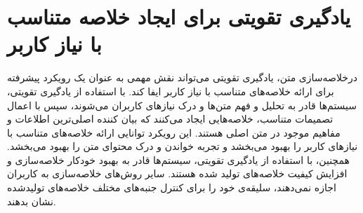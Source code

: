 \section{ یادگیری تقویتی برای ایجاد خلاصه متناسب با نیاز کاربر}
درخلاصه‌سازی متن، یادگیری تقویتی می‌تواند نقش مهمی به عنوان یک رویکرد پیشرفته برای ارائه خلاصه‌های متناسب با نیاز کاربر ایفا کند. با استفاده از یادگیری تقویتی، سیستم‌ها قادر به تحلیل و فهم متن‌ها و درک نیازهای کاربران می‌شوند، سپس با اعمال تصمیمات متناسب، خلاصه‌هایی ایجاد می‌کنند که بیان کننده اصلی‌ترین اطلاعات و مفاهیم موجود در متن اصلی هستند. این رویکرد توانایی ارائه خلاصه‌های متناسب با نیازهای کاربر را بهبود می‌بخشد و تجربه خواندن و درک محتوای متن را بهبود می‌بخشد. همچنین، با استفاده از یادگیری تقویتی، سیستم‌ها قادر به بهبود خودکار خلاصه‌سازی و افزایش کیفیت خلاصه‌های تولید شده هستند. %
سایر روش‌های خلاصه‌سازی به کاربران اجازه نمی‌دهند، سلیقه‌ی خود را برای کنترل  جنبه‌های مختلف خلاصه‌های تولیدشده نشان بدهند. 

